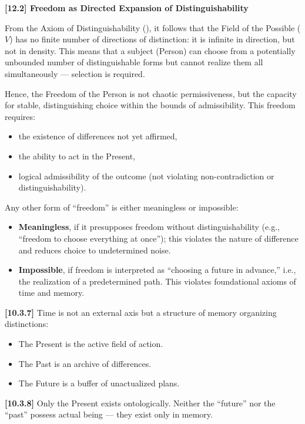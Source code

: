 \documentclass[12pt]{article}
\begin{document}
\textbf{[12.2] Freedom as Directed Expansion of Distinguishability}

From the Axiom of Distinguishability (\text{[5]}), it follows that the Field of the Possible ($V$) has no finite number of directions of distinction: it is infinite in direction, but not in density. This means that a subject (Person) can choose from a potentially unbounded number of distinguishable forms but cannot realize them all simultaneously — selection is required.

Hence, the Freedom of the Person is not chaotic permissiveness, but the capacity for stable, distinguishing choice within the bounds of admissibility. This freedom requires:

\begin{itemize}
\item the existence of differences not yet affirmed,
\item the ability to act in the Present,
\item logical admissibility of the outcome (not violating non-contradiction or distinguishability).
\end{itemize}

Any other form of ``freedom'' is either meaningless or impossible:

\begin{itemize}
\item \textbf{Meaningless}, if it presupposes freedom without distinguishability (e.g., ``freedom to choose everything at once''); this violates the nature of difference and reduces choice to undetermined noise.
\item \textbf{Impossible}, if freedom is interpreted as ``choosing a future in advance,'' i.e., the realization of a predetermined path. This violates foundational axioms of time and memory.
\end{itemize}

\textbf{[10.3.7]} Time is not an external axis but a structure of memory organizing distinctions:
\begin{itemize}
\item The Present is the active field of action.
\item The Past is an archive of differences.
\item The Future is a buffer of unactualized plans.
\end{itemize}

\textbf{[10.3.8]} Only the Present exists ontologically. Neither the ``future'' nor the ``past'' possess actual being — they exist only in memory.
\end{document}
